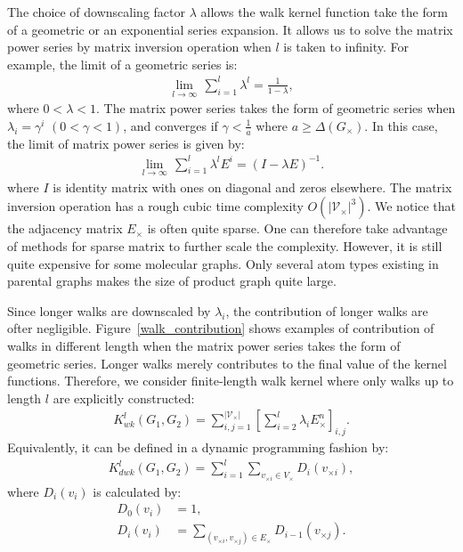 \documentclass[english]{tktltiki}
\newcommand{\Vcal}{\mathcal{V}}
\begin{document}
The choice of downscaling factor $\lambda$ allows the walk kernel function take the form of a geometric or an exponential series expansion. It allows us to solve the matrix power series by matrix inversion operation \cite{gartner03} when $l$ is taken to infinity. For example, the limit of a geometric series is:
\begin{align*}
\underset{l \to \infty}{\operatorname{lim}} \, \sum_{i=1}^{l}{\lambda^l} = \frac{1}{1-\lambda},
\end{align*}
where $0<\lambda<1$. The matrix power series takes the form of geometric series when $\lambda_i = \gamma^i$ $(0<\gamma<1)$, and converges if $\gamma<\frac{1}{a}$ where $a \ge \Delta(G_{\times})$. In this case, the limit of matrix power series is given by:
\begin{align*}
\underset{l \to \infty}{\operatorname{lim}} \, \sum_{i=1}^{l}{\lambda^lE^i} = (I-\lambda E)^{-1}.
\end{align*}
where $I$ is identity matrix with ones on diagonal and zeros elsewhere. The matrix inversion operation has a rough cubic time complexity $O(|\Vcal_{\times}|^3)$. We notice that the adjacency matrix $E_{\times}$ is often quite sparse. One can therefore take advantage of methods for sparse matrix to further scale the complexity. However, it is still quite expensive for some molecular graphs. Only several atom types existing in parental graphs makes the size of product graph quite large. 

Since longer walks are downscaled by \(\lambda_i\), the contribution of longer walks are ofter negligible. Figure~\ref{walk_contribution} shows examples of contribution of walks in different length when the matrix power series takes the form of geometric series. Longer walks merely contributes to the final value of the kernel functions. Therefore, we consider finite-length walk kernel where only walks up to length \(l\) are explicitly constructed: 
\begin{align*}
K_{wk}^{l}(G_1,G_2) = \displaystyle\sum_{i,j = 1}^{\vert \Vcal_{\times} \vert }{\left[\sum_{i=2}^{l}{\lambda_i E_\times^n}\right]_{i,j}}.
\end{align*}
Equivalently, it can be defined in a dynamic programming fashion by:
\begin{align}
K_{dwk}^{l}(G_1,G_2) = \sum_{i=1}^{l}\sum_{v_{\times i} \in V_\times}{D_i(v_{\times i})},
\label{wk_definition_2}
\end{align}
where \(D_i(v_i)\) is calculated by:
\begin{align*}
D_0(v_i) &= 1, \\
D_i(v_i) &= \displaystyle\sum_{(v_{\times i},v_{\times j}) \in E_\times}{D_{i-1}(v_{\times j})}.
\end{align*}
\end{document}
